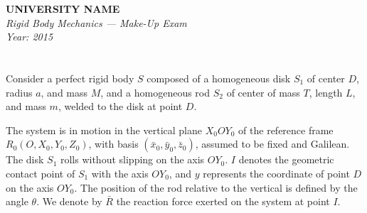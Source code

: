 \documentclass[12pt]{article}
\begin{document}
\begin{center}
  \Large\textbf{UNIVERSITY NAME} \\[1em]
  \large\textit{Rigid Body Mechanics — Make-Up Exam} \\[0.5em]
  \large\textit{Year: 2015} \\[2em]
\end{center}

\vspace{0.5cm}

\section{}
Consider a perfect rigid body \( S \) composed of a homogeneous disk \( S_1 \) of center \( D \), radius \( a \), and mass \( M \), and a homogeneous rod \( S_2 \) of center of mass \( T \), length \( L \), and mass \( m \), welded to the disk at point \( D \).

The system is in motion in the vertical plane \( X_0 OY_0 \) of the reference frame \( R_0 (O, X_0, Y_0, Z_0) \), with basis \( (\bar{x}_0, \bar{y}_0, \bar{z}_0) \), assumed to be fixed and Galilean. The disk \( S_1 \) rolls without slipping on the axis \( OY_0 \).  
\( I \) denotes the geometric contact point of \( S_1 \) with the axis \( OY_0 \), and \( y \) represents the coordinate of point \( D \) on the axis \( OY_0 \). The position of the rod relative to the vertical is defined by the angle \( \theta \). We denote by \( \bar{R} \) the reaction force exerted on the system at point \( I \).
\end{document}
